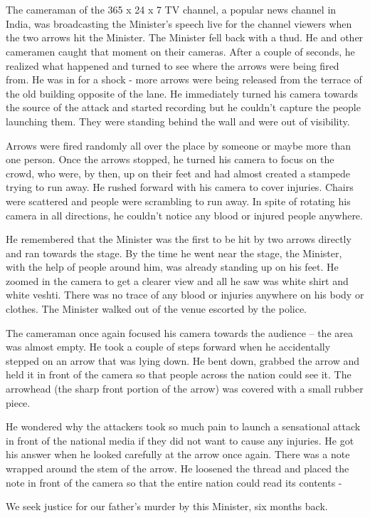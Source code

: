 \chapter{}

The cameraman of the 365 x 24 x 7 TV channel, a popular news channel in India,
was broadcasting the Minister's speech live for the channel viewers when the two
arrows hit the Minister. The Minister fell back with a thud. He and other
cameramen caught that moment on their cameras. After a couple of seconds, he
realized what happened and turned to see where the arrows were being fired from.
He was in for a shock - more arrows were being released from the terrace of the
old building opposite of the lane. He immediately turned his camera towards the
source of the attack and started recording but he couldn't capture the people
launching them. They were standing behind the wall and were out of visibility.

Arrows were fired randomly all over the place by someone or maybe more than one
person. Once the arrows stopped, he turned his camera to focus on the crowd, who
were, by then, up on their feet and had almost created a stampede trying to run
away. He rushed forward with his camera to cover injuries. Chairs were scattered
and people were scrambling to run away. In spite of rotating his camera in all
directions, he couldn't notice any blood or injured people anywhere.

He remembered that the Minister was the first to be hit by two arrows directly
and ran towards the stage. By the time he went near the stage, the Minister,
with the help of people around him, was already standing up on his feet. He
zoomed in the camera to get a clearer view and all he saw was white shirt and
white veshti. There was no trace of any blood or injuries anywhere on his body
or clothes. The Minister walked out of the venue escorted by the police.

The cameraman once again focused his camera towards the audience – the area was
almost empty. He took a couple of steps forward when he accidentally stepped on
an arrow that was lying down. He bent down, grabbed the arrow and held it in
front of the camera so that people across the nation could see it. The arrowhead
(the sharp front portion of the arrow) was covered with a small rubber piece.

He wondered why the attackers took so much pain to launch a sensational attack
in front of the national media if they did not want to cause any injuries. He
got his answer when he looked carefully at the arrow once again. There was a
note wrapped around the stem of the arrow. He loosened the thread and placed the
note in front of the camera so that the entire nation could read its contents -

We seek justice for our father's murder by this Minister, six months back.